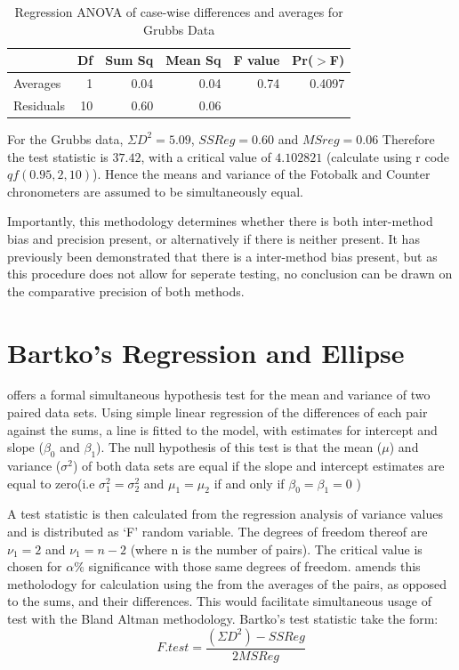 \documentclass[12pt, a4paper]{report}
\theoremstyle{plain}
\theoremstyle{definition}
\theoremstyle{remark}
\begin{document}
	\newpage
	
	\begin{table}[ht]
		\begin{center}
			\begin{tabular}{lrrrrr}
				\hline
				& Df & Sum Sq & Mean Sq & F value & Pr($>$F) \\
				\hline
				Averages & 1 & 0.04 & 0.04 & 0.74 & 0.4097 \\
				Residuals & 10 & 0.60 & 0.06 &  &  \\
				\hline
			\end{tabular}
			\caption{Regression ANOVA of case-wise differences and averages
				for Grubbs Data}
		\end{center}
	\end{table}
	
	
	
	
	For the Grubbs data, $\Sigma D^{2}=5.09 $, $SSReg = 0.60$ and
	$MSreg=0.06$ Therefore the test statistic is $37.42$, with a
	critical value of $4.102821$ (calculate using r code
	$qf(0.95,2,10)$). Hence the means and variance of the Fotobalk and
	Counter chronometers are assumed to be simultaneously equal.
	
	Importantly, this methodology determines whether there is both
	inter-method bias and precision present, or alternatively if there
	is neither present. It has previously been demonstrated that there
	is a inter-method bias present, but as this procedure does not
	allow for seperate testing, no conclusion can be drawn on the
	comparative precision of both methods.
	\newpage

	\section{Bartko's Regression and Ellipse}
	\citet{BB89} offers a formal simultaneous hypothesis test for the
	mean and variance of two paired data sets. Using simple linear
	regression of the differences of each pair against the sums, a
	line is fitted to the model, with estimates for intercept and
	slope ($\beta_{0}$ and $\beta_{1}$). The null hypothesis of this
	test is that the mean ($\mu$) and variance ($\sigma^{2}$) of both
	data sets are equal if the slope and intercept estimates are equal
	to zero(i.e $\sigma^{2}_{1} = \sigma^{2}_{2}$ and
	$\mu_{1}=\mu_{2}$ if and only if $\beta_{0}= \beta_{1}=0$ )
	
	A test statistic is then calculated from the regression analysis
	of variance values \citep{BB89} and is distributed as `F' random
	variable. The degrees of freedom thereof are $\nu_{1}=2$ and
	$\nu_{1}=n-2$ (where n is the number of pairs). The critical value
	is chosen for $\alpha\%$ significance with those same degrees of
	freedom. \citet{Bartko} amends this metholodogy for calculation
	using the from the averages of the pairs, as opposed to the sums,
	and their differences. This would facilitate simultaneous usage of
	test with the Bland Altman methodology. Bartko's test statistic
	take the form:
	\begin{equation} F.test = \frac{(\Sigma D^{2})-SSReg}{2MSReg}
	\end{equation}
	
\end{document}
